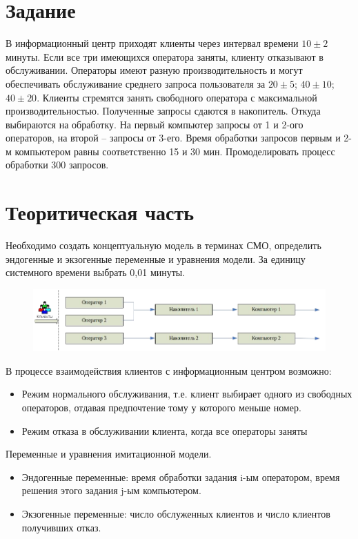 \section{Задание}

В информационный центр приходят клиенты через интервал времени $10\pm2$  минуты.
Если все три имеющихся оператора заняты, клиенту отказывают в обслуживании.
Операторы имеют разную производительность и могут обеспечивать обслуживание среднего запроса пользователя за $20\pm5$; $40\pm10$; $40\pm20$.
Клиенты стремятся занять свободного оператора с максимальной производительностью.
Полученные запросы сдаются в накопитель. Откуда выбираются на обработку.
На первый компьютер запросы от 1 и 2-ого операторов, на второй -- запросы от 3-его.
Время обработки запросов первым и 2-м компьютером равны соответственно 15 и 30 мин.
Промоделировать процесс обработки 300 запросов. 

\section{Теоритическая часть}

Необходимо создать концептуальную модель в терминах СМО, определить эндогенные и экзогенные переменные и уравнения модели.
За единицу системного времени выбрать 0,01 минуты.

\begin{figure}[h!]
\centering
\includegraphics[width=\textwidth]{5/5_1}
\end{figure}


В процессе взаимодействия клиентов с информационным центром возможно:

\begin{itemize}
    \item Режим нормального обслуживания, т.е. клиент выбирает одного из свободных операторов, отдавая предпочтение тому у которого меньше номер.
    \item Режим отказа в обслуживании клиента, когда все операторы заняты
\end{itemize}

Переменные и уравнения имитационной модели.

\begin{itemize}
    \item Эндогенные переменные: время обработки задания i-ым оператором, время решения этого задания j-ым компьютером.
    \item Экзогенные переменные: число обслуженных клиентов и число клиентов получивших отказ.
\end{itemize}



